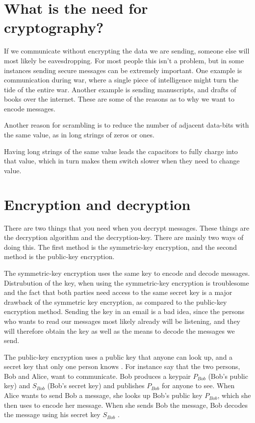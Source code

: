 \section{What is the need for cryptography?}
If we communicate without encrypting the data we are sending, someone 
else will most likely be eavesdropping. For most people this isn’t a problem, 
but in some instances sending secure messages can be extremely important. One 
example is communication during war, where a single piece of intelligence might 
turn the tide of the entire war. Another example is sending manuscripts, and 
drafts of books over the internet. These are some of the reasons as to why we 
want to encode messages.

Another reason for scrambling is to reduce the number of adjacent data-bits with 
the same value, as in long strings of zeros or ones. 

Having long strings of the same value leads the capacitors to fully charge into 
that value, which in turn makes them switch slower when they need to change 
value. 

\section{Encryption and decryption}
There are two things that you need when you decrypt messages. These things 
are the decryption algorithm and the decryption-key. There are mainly two ways 
of doing this. The first method is the symmetric-key encryption, and the second 
method is the public-key encryption.

The symmetric-key encryption uses the same key to encode and decode messages. 
Distrubution of the key, when using the symmetric-key encryption is troublesome 
and the fact that both parties need access to the same secret key is a major 
drawback of the symmetric key encryption, as compared to the public-key 
encryption method. Sending the key in an email is a bad idea, since the persons 
who wants to read our messages  most likely already will be listening, and they 
will therefore obtain the key as well as the means to decode the messages we 
send.

The public-key encryption uses a public key that anyone can look up, and a 
secret key that only one person knows \citep[pp. 25--32]{Simmons:1992}.
For instance say that the two persons, Bob and Alice, want to communicate. 
Bob produces a keypair \(P_{Bob}\) (Bob’s public key) and \(S_{Bob}\) 
(Bob’s secret key) and publishes \(P_{Bob}\) for anyone to see. When Alice wants 
to send Bob a message, she looks up Bob’s public key \(P_{Bob}\), which she then 
uses to encode her message. When she sends Bob the message, Bob decodes the 
message using his secret key \(S_{Bob}\) \citep{Schneier:2003}.

